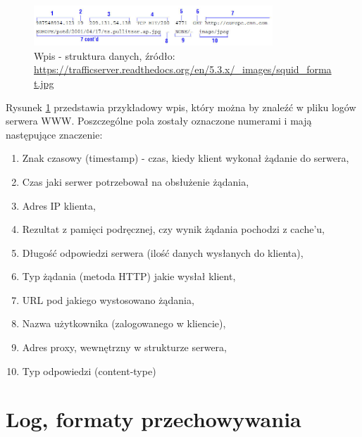     \begin{figure}[H]
        \centering
        \includegraphics[width=0.80\textwidth]{images/log_data_structure}
        \caption[Wpis w logu jako struktura danych]{
            Wpis - struktura danych, źródło: \url{https://trafficserver.readthedocs.org/en/5.3.x/_images/squid_format.jpg}
        }
        \label{chapter:logs:history:log_as_data_structure_picture}
    \end{figure}
    
    Rysunek \ref{chapter:logs:history:log_as_data_structure_picture} przedstawia przykładowy wpis, który można by znaleźć
    w pliku logów serwera WWW. Poszczególne pola zostały oznaczone numerami i mają następujące znaczenie:
    \begin{enumerate}
        \item Znak czasowy (timestamp) - czas, kiedy klient wykonał żądanie do serwera,
        \item Czas jaki serwer potrzebował na obsłużenie żądania,
        \item Adres IP klienta,
        \item Rezultat z pamięci podręcznej, czy wynik żądania pochodzi z cache'u,
        \item Długość odpowiedzi serwera (ilość danych wysłanych do klienta),
        \item Typ żądania (metoda HTTP) jakie wysłał klient,
        \item URL pod jakiego wystosowano żądania,
        \item Nazwa użytkownika (zalogowanego w kliencie),
        \item Adres proxy, wewnętrzny w strukturze serwera,
        \item Typ odpowiedzi (content-type)
    \end{enumerate}
    
\section{Log, formaty przechowywania}


